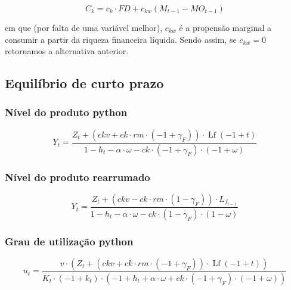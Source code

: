 \documentclass[11pt]{article}
\begin{document}
\begin{latex}
\begin{equation}
C_{k} = c_{k} \cdot FD + c_{kw}(M_{t-1} - MO_{t-1})
\end{equation}
\end{latex}
em que (por falta de uma variável melhor), \(c_{kw}\) é a propensão marginal a consumir a partir da riqueza financeira líquida.
Sendo assim, se \(c_{kw} = 0\) retornamos a alternativa anterior.

\subsection*{Equilíbrio de curto prazo}
\label{sec:orga45bb4c}

\subsubsection*{Nível do produto python}
\label{sec:org2d68541}


\begin{latex}
\begin{equation}
Y_{t} = \frac{Z_t + \left(ckv + ck \cdot rm \cdot \left(-1 + \gamma_{F}\right)\right) \cdot \operatorname{Lf}{\left(-1 + t \right)}}{1 - h_t - \alpha \cdot \omega - ck \cdot \left(-1 + \gamma_{F}\right) \cdot \left(-1 + \omega\right)}
\end{equation}
\end{latex}

\subsubsection*{Nível do produto rearrumado}
\label{sec:org9c79c97}


\begin{latex}
\begin{equation}
Y_{t} = \frac{Z_t + \left(ckv - ck \cdot rm \cdot \left(1 - \gamma_{F}\right)\right) \cdot L_{f_{t-1}}}{1 - h_t - \alpha \cdot \omega - ck \cdot \left(1 - \gamma_{F}\right) \cdot \left(1 - \omega\right)}
\end{equation}
\end{latex}

\subsubsection*{Grau de utilização python}
\label{sec:org58af10d}


\begin{latex}
\begin{equation}
u_{t} = \frac{v \cdot \left(Z_t + \left(ckv + ck \cdot rm \cdot \left(-1 + \gamma_{F}\right)\right) \cdot \operatorname{Lf}{\left(-1 + t \right)}\right)}{K_t \cdot \left(-1 + k_t\right) \cdot \left(-1 + h_t + \alpha \cdot \omega + ck \cdot \left(-1 + \gamma_{F}\right) \cdot \left(-1 + \omega\right)\right)}
\end{equation}
\end{latex}
\end{document}
